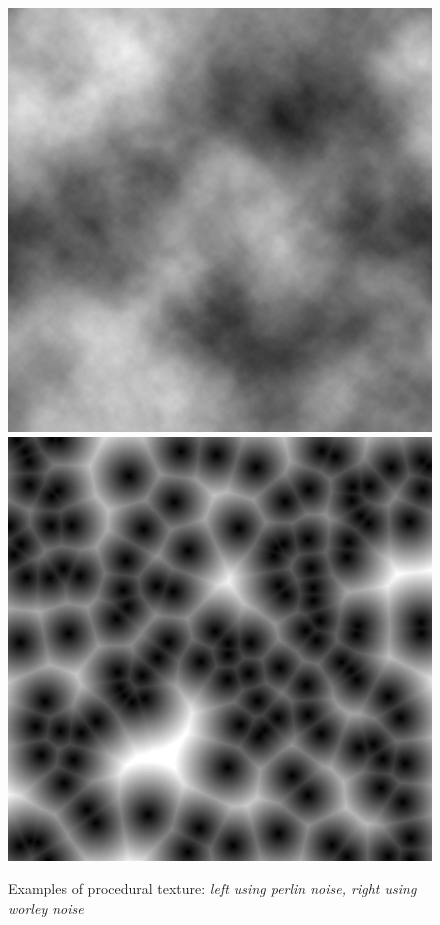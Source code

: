 \begin{figure}
    \begin{center}
    \includegraphics[scale=0.2]{images/PerlinNoise2d.png}
    \includegraphics[scale=0.1]{images/WorleyNoise2d.jpg}
    \end{center}
    \caption{Examples of procedural texture: \textit{left using perlin noise, right using worley noise}}
    \label{procedural_texture}
\end{figure}

